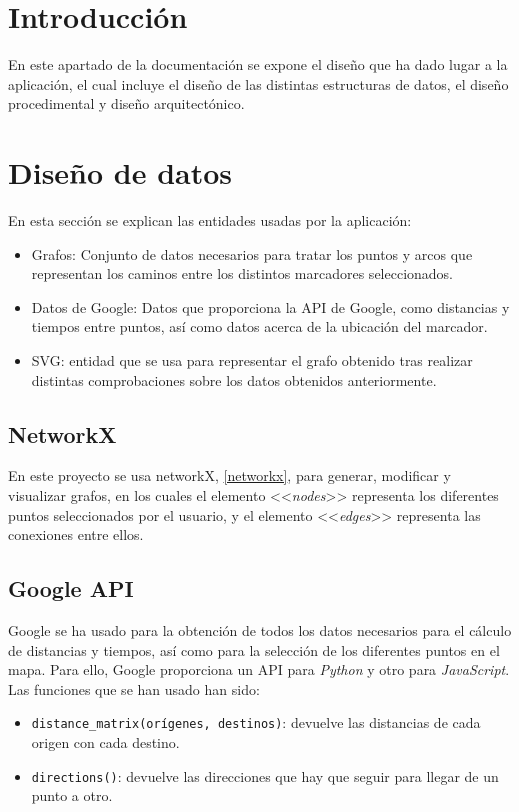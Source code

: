 
\section{Introducción}
En este apartado de la documentación se expone el diseño que ha dado lugar a la aplicación, el cual incluye el diseño de las distintas estructuras de datos, el diseño procedimental y diseño arquitectónico.

\section{Diseño de datos}
En esta sección se explican las entidades usadas por la aplicación:
\begin{itemize}
	\item Grafos: Conjunto de datos necesarios para tratar los puntos y arcos que representan los caminos entre los distintos marcadores seleccionados.
	\item Datos de Google: Datos que proporciona la API de Google, como distancias y tiempos entre puntos, así como datos acerca de la ubicación del marcador.
	\item SVG: entidad que se usa para representar el grafo obtenido tras realizar distintas comprobaciones sobre los datos obtenidos anteriormente.
\end{itemize}

\subsection{NetworkX}
En este proyecto se usa networkX, \ref{networkx}, para generar, modificar y visualizar grafos, en los cuales el elemento <<\textit{nodes}>> representa los diferentes puntos seleccionados por el usuario, y el elemento <<\textit{edges}>> representa las conexiones entre ellos.

\subsection{Google API}
Google se ha usado para la obtención de todos los datos necesarios para el cálculo de distancias y tiempos, así como para la selección de los diferentes puntos en el mapa. Para ello, Google proporciona un API para \textit{Python} y otro para \textit{JavaScript}. Las funciones que se han usado han sido:
\begin{itemize}
	\item \texttt{distance\_matrix(orígenes, destinos)}: devuelve las distancias de cada origen con cada destino.
	\item \texttt{directions()}: devuelve las direcciones que hay que seguir para llegar de un punto a otro.
\end{itemize}

